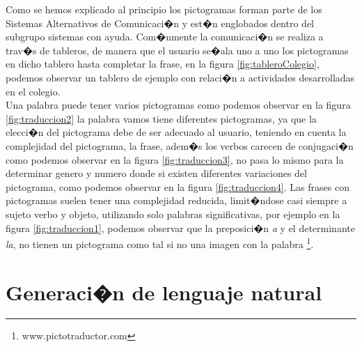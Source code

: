 \label{cap2:sec:Lenguajeatravesdepictogramas}


Como se hemos explicado al principio los pictogramas forman parte de los Sistemas Alternativos de Comunicaci�n y est�n englobados dentro del subgrupo sistemas con ayuda. Com�nmente la comunicaci�n se realiza a trav�s de tableros, de manera que el usuario se�ala uno a uno los pictogramas en dicho tablero hasta completar la frase, en la figura \ref{fig:tableroColegio}, podemos observar un tablero de ejemplo con relaci�n a actividades desarrolladas en el colegio.
\\ 
Una palabra puede tener varios pictogramas como podemos observar en la figura \ref{fig:traduccion2} la palabra vamos tiene diferentes pictogramas, ya que la elecci�n del pictograma debe de ser adecuado al usuario, teniendo en cuenta la complejidad del pictograma, la frase, adem�s los verbos carecen de conjugaci�n como podemos observar en la figura \ref{fig:traduccion3}, no pasa lo mismo para la determinar genero y numero donde si existen diferentes variaciones del pictograma, como podemos observar en la figura \ref{fig:traduccion4}. Las frases con pictogramas suelen tener una complejidad reducida, limit�ndose casi siempre a sujeto verbo y objeto, utilizando solo palabras significativas, por ejemplo en la figura \ref{fig:traduccion1}, podemos observar que la preposici�n  \textit{a} y el determinante \textit{la}, no tienen un pictograma como tal si no una imagen con la palabra \footnote{www.pictotraductor.com}.

\section{Generaci�n de lenguaje natural}
\label{cap2:sec:Generaci�nDeLenguajeNatural}

